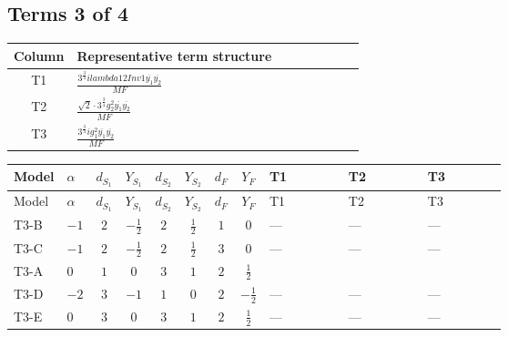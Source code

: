 \documentclass[8pt]{article}
\begin{document}
\begin{landscape}
\subsection*{Terms 3 of 4}
\begin{center}
\begin{tabular}{@{}c >{\raggedright\arraybackslash}p{0.82\linewidth}@{}}
\toprule
Column & Representative term structure \\
\midrule
T1 & \(\displaystyle \frac{3^{\frac{3}{4}} i lambda12Inv1 \overline{y_{1}} \overline{y_{2}}}{MF}\) \\
\midrule
T2 & \(\displaystyle \frac{\sqrt{2} \cdot 3^{\frac{3}{4}} g_{2}^{2} \overline{y_{1}} \overline{y_{2}}}{MF}\) \\
\midrule
T3 & \(\displaystyle \frac{3^{\frac{3}{4}} i g_{1}^{2} \overline{y_{1}} \overline{y_{2}}}{MF}\) \\
\midrule
\bottomrule
\end{tabular}
\end{center}
\smallskip
\tiny
\begin{longtable}{@{}llcccccc >{\raggedright\arraybackslash}p{0.21\linewidth} >{\raggedright\arraybackslash}p{0.21\linewidth} >{\raggedright\arraybackslash}p{0.21\linewidth}@{}}
\toprule
Model & $\alpha$ & $d_{S_1}$ & $Y_{S_1}$ & $d_{S_2}$ & $Y_{S_2}$ & $d_F$ & $Y_F$ & T1 & T2 & T3 \\
\midrule
\endfirsthead
\toprule
Model & $\alpha$ & $d_{S_1}$ & $Y_{S_1}$ & $d_{S_2}$ & $Y_{S_2}$ & $d_F$ & $Y_F$ & T1 & T2 & T3 \\
\midrule
\endhead
T3-B & $-1$ & $2$ & $-\frac{1}{2}$ & $2$ & $\frac{1}{2}$ & $1$ & $0$ & --- & --- & --- \\
\midrule
T3-C & $-1$ & $2$ & $-\frac{1}{2}$ & $2$ & $\frac{1}{2}$ & $3$ & $0$ & --- & --- & --- \\
\midrule
T3-A & $0$ & $1$ & $0$ & $3$ & $1$ & $2$ & $\frac{1}{2}$ & \scriptsize\adjustbox{max width=\linewidth}{$\begin{gathered} \frac{3^{\frac{3}{4}} i lambda12Inv1 \overline{y_{1}} \overline{y_{2}}}{6 MF}\end{gathered}$} & \scriptsize\adjustbox{max width=\linewidth}{$\begin{gathered} \frac{\sqrt{2} \cdot 3^{\frac{3}{4}} g_{2}^{2} \overline{y_{1}} \overline{y_{2}}}{6 MF}\end{gathered}$} & \scriptsize\adjustbox{max width=\linewidth}{$\begin{gathered} \frac{3^{\frac{3}{4}} i g_{1}^{2} \overline{y_{1}} \overline{y_{2}}}{8 MF}\end{gathered}$} \\
\midrule
T3-D & $-2$ & $3$ & $-1$ & $1$ & $0$ & $2$ & $-\frac{1}{2}$ & --- & --- & --- \\
\midrule
T3-E & $0$ & $3$ & $0$ & $3$ & $1$ & $2$ & $\frac{1}{2}$ & --- & --- & --- \\
\midrule
\bottomrule
\end{longtable}
\clearpage

\end{landscape}
\end{document}
